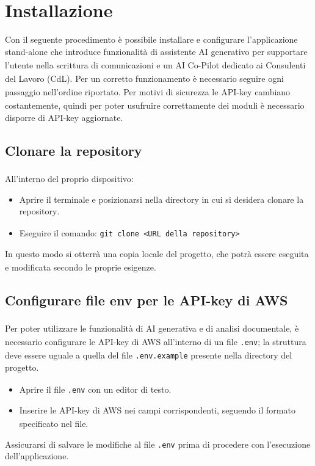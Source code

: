 \documentclass[a4paper,11pt]{article}
\newcommand{\G}{\textsubscript{\scalebox{0.6}{\textbf{G}}}}
\begin{document}
\section{Installazione}
Con il seguente procedimento è possibile installare e configurare l'applicazione stand-alone\G{} che introduce 
funzionalità\G{} di assistente AI\G{} generativo per supportare l'utente nella scrittura di comunicazioni e un AI Co-Pilot\G{} dedicato ai Consulenti del Lavoro (CdL)\G{}.
Per un corretto funzionamento è necessario seguire ogni passaggio nell'ordine riportato.
Per motivi di sicurezza\G{} le API-key cambiano costantemente, quindi per poter usufruire correttamente dei moduli è necessario disporre di API-key aggiornate.

\subsection{Clonare la repository\G{}}
All'interno del proprio dispositivo:
\begin{itemize}
    \item Aprire il terminale e posizionarsi nella directory in cui si desidera clonare la repository\G{}.
    \item Eseguire il comando: \texttt{git clone <URL della repository>}
\end{itemize}

In questo modo si otterrà una copia locale del progetto\G{}, che potrà essere eseguita e modificata secondo le proprie esigenze.

\subsection{Configurare file env per le API-key di AWS\G{}}
Per poter utilizzare le funzionalità\G{} di AI\G{} generativa e di analisi documentale, è necessario configurare le API-key di AWS\G{} all'interno di un file \texttt{.env}; la struttura deve essere uguale a quella del file \texttt{.env.example} presente nella directory del progetto\G{}.
\begin{itemize}
    \item Aprire il file \texttt{.env} con un editor di testo.
    \item Inserire le API-key di AWS\G{} nei campi corrispondenti, seguendo il formato specificato nel file.
\end{itemize}
Assicurarsi di salvare le modifiche al file \texttt{.env} prima di procedere con l'esecuzione dell'applicazione.
\end{document}
